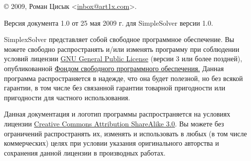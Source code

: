 \documentclass[pdftex, unicode, a4paper,12pt,oneside,utf8x, usehyperref]{report-gost}
\begin{document}
© 2009, Роман Цисык <\href{mailto:inbox@art1x.com}{inbox@art1x.com}>.

Версия документа 1.0 от 25 мая 2009 г. для SimpleSolver версии 1.0.

SimplexSolver представляет собой свободное программное обеспечение.
Вы можете свободно распространять и/или изменять программу при соблюдении условий лицензии \href{http://www.gnu.org/licenses/gpl.html}{GNU General Public License}
(версии 3 или более поздней), опубликованной
\href{http://www.fsf.org/}{Фондом свободного программного обеспечения.}
Данная программа распространяется в надежде, что она будет полезной,
но без всякой гарантии, в том числе без связанной гарантии товарной пригодности
или пригодности для частного использования.

Данная документация и логотип программы распространяется на условиях лицензии \href{http://www.creativecommons.org/licenses/by-sa/3.0/}{Creative Commons Attribution ShareAlike 3.0}.
Вы можете без ограничений распространять их, изменять и использовать в любых (в том числе коммерческих) целях при условии указания оригинального авторства и сохранения данной лицензии в производных работах.

\newpage

\frontmatter %

\tableofcontents

\mainmatter %










\backmatter
\end{document}
